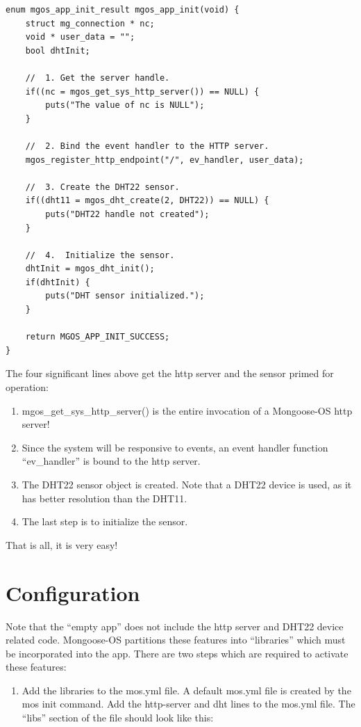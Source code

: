 \documentclass[oneside,letterpaper,12pt]{book}
\providecommand{\tightlist}{%
  \setlength{\itemsep}{0pt}\setlength{\parskip}{0pt}}
\begin{document}
\begin{verbatim}
enum mgos_app_init_result mgos_app_init(void) {
    struct mg_connection * nc;
    void * user_data = "";
    bool dhtInit;

    //  1. Get the server handle.
    if((nc = mgos_get_sys_http_server()) == NULL) {
        puts("The value of nc is NULL");
    }

    //  2. Bind the event handler to the HTTP server.
    mgos_register_http_endpoint("/", ev_handler, user_data);

    //  3. Create the DHT22 sensor.
    if((dht11 = mgos_dht_create(2, DHT22)) == NULL) {
        puts("DHT22 handle not created");
    }

    //  4.  Initialize the sensor.
    dhtInit = mgos_dht_init();
    if(dhtInit) {
        puts("DHT sensor initialized.");
    }

    return MGOS_APP_INIT_SUCCESS;
}
\end{verbatim}

The four significant lines above get the http server and the sensor
primed for operation:

\begin{enumerate}
\def\labelenumi{\arabic{enumi}.}
\tightlist
\item
  mgos\_get\_sys\_http\_server() is the entire invocation of a
  Mongoose-OS http server!
\item
  Since the system will be responsive to events, an event handler
  function ``ev\_handler'' is bound to the http server.
\item
  The DHT22 sensor object is created. Note that a DHT22 device is used,
  as it has better resolution than the DHT11.
\item
  The last step is to initialize the sensor.
\end{enumerate}

That is all, it is very easy!

\section{Configuration}\label{configuration}

Note that the ``empty app'' does not include the http server and DHT22
device related code. Mongoose-OS partitions these features into
``libraries'' which must be incorporated into the app. There are two
steps which are required to activate these features:

\begin{enumerate}
\def\labelenumi{\arabic{enumi}.}
\tightlist
\item
  Add the libraries to the mos.yml file. A default mos.yml file is
  created by the mos init command. Add the http-server and dht lines to
  the mos.yml file. The ``libs'' section of the file should look like
  this:
\end{enumerate}
\end{document}

